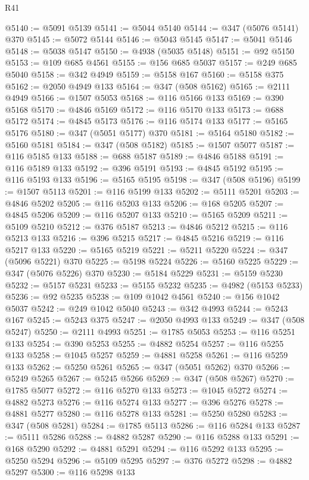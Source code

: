 \begin{lexlean}{R41}
\begin{coremodule}
@5140 := @5091 @5139
@5141 := @5044 @5140
@5144 := @347 (@5076 @5141) @370
@5145 := @5072 @5144
@5146 := @5043 @5145
@5147 := @5041 @5146
@5148 := @5038 @5147
@5150 := @4938 (@5035 @5148)
@5151 := @92 @5150
@5153 := @109 @685 @4561
@5155 := @156 @685 @5037
@5157 := @249 @685 @5040
@5158 := @342 @4949
@5159 := @5158 @167
@5160 := @5158 @375
@5162 := @2050 @4949 @133
@5164 := @347 (@508 @5162)
@5165 := @2111 @4949
@5166 := @1507 @5053
@5168 := @116 @5166 @133
@5169 := @390 @5168
@5170 := @4846 @5169
@5172 := @116 @5170 @133
@5173 := @688 @5172
@5174 := @4845 @5173
@5176 := @116 @5174 @133
@5177 := @5165 @5176
@5180 := @347 (@5051 @5177) @370
@5181 := @5164 @5180
@5182 := @5160 @5181
@5184 := @347 (@508 @5182)
@5185 := @1507 @5077
@5187 := @116 @5185 @133
@5188 := @688 @5187
@5189 := @4846 @5188
@5191 := @116 @5189 @133
@5192 := @396 @5191
@5193 := @4845 @5192
@5195 := @116 @5193 @133
@5196 := @5165 @5195
@5198 := @347 (@508 @5196)
@5199 := @1507 @5113
@5201 := @116 @5199 @133
@5202 := @5111 @5201
@5203 := @4846 @5202
@5205 := @116 @5203 @133
@5206 := @168 @5205
@5207 := @4845 @5206
@5209 := @116 @5207 @133
@5210 := @5165 @5209
@5211 := @5109 @5210
@5212 := @376 @5187
@5213 := @4846 @5212
@5215 := @116 @5213 @133
@5216 := @396 @5215
@5217 := @4845 @5216
@5219 := @116 @5217 @133
@5220 := @5165 @5219
@5221 := @5211 @5220
@5224 := @347 (@5096 @5221) @370
@5225 := @5198 @5224
@5226 := @5160 @5225
@5229 := @347 (@5076 @5226) @370
@5230 := @5184 @5229
@5231 := @5159 @5230
@5232 := @5157 @5231
@5233 := @5155 @5232
@5235 := @4982 (@5153 @5233)
@5236 := @92 @5235
@5238 := @109 @1042 @4561
@5240 := @156 @1042 @5037
@5242 := @249 @1042 @5040
@5243 := @342 @4993
@5244 := @5243 @167
@5245 := @5243 @375
@5247 := @2050 @4993 @133
@5249 := @347 (@508 @5247)
@5250 := @2111 @4993
@5251 := @1785 @5053
@5253 := @116 @5251 @133
@5254 := @390 @5253
@5255 := @4882 @5254
@5257 := @116 @5255 @133
@5258 := @1045 @5257
@5259 := @4881 @5258
@5261 := @116 @5259 @133
@5262 := @5250 @5261
@5265 := @347 (@5051 @5262) @370
@5266 := @5249 @5265
@5267 := @5245 @5266
@5269 := @347 (@508 @5267)
@5270 := @1785 @5077
@5272 := @116 @5270 @133
@5273 := @1045 @5272
@5274 := @4882 @5273
@5276 := @116 @5274 @133
@5277 := @396 @5276
@5278 := @4881 @5277
@5280 := @116 @5278 @133
@5281 := @5250 @5280
@5283 := @347 (@508 @5281)
@5284 := @1785 @5113
@5286 := @116 @5284 @133
@5287 := @5111 @5286
@5288 := @4882 @5287
@5290 := @116 @5288 @133
@5291 := @168 @5290
@5292 := @4881 @5291
@5294 := @116 @5292 @133
@5295 := @5250 @5294
@5296 := @5109 @5295
@5297 := @376 @5272
@5298 := @4882 @5297
@5300 := @116 @5298 @133

\end{coremodule}
\end{lexlean}

